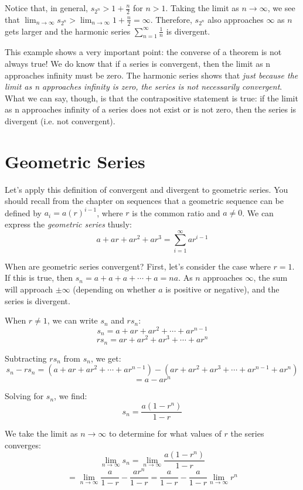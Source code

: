 Notice that, in general, $s_{2^n} > 1 + \frac{n}{2}$ for $n > 1$. Taking the 
limit as $n \to \infty$, we see that $\lim_{n \to \infty} s_{2^n} > \lim_{n 
\to \infty} 1 + \frac{n}{2} = \infty$. Therefore, $s_{2^n}$ also approaches 
$\infty$ as $n$ gets larger and the harmonic series $\sum_{n = 1}^\infty 
\frac{1}{n}$ is divergent. 

This example shows a very important point: the converse of a theorem is not 
always true! We do know that if a series is convergent, then the limit as n 
approaches infinity must be zero. The harmonic series shows that \textit{just 
because the limit as n approaches infinity is zero, the series is not 
necessarily convergent}. What we can say, though, is that the contrapositive 
statement is true: if the limit as n approaches infinity of a series does not 
exist or is not zero, then the series is divergent (i.e. not convergent). 

\section{Geometric Series}

Let's apply this definition of convergent and divergent to geometric 
series. You should recall from the chapter on sequences that a 
geometric sequence can be defined by $a_i = a(r)^{i-1}$, where $r$ 
is the common ratio and $a \neq 0$. We can express the 
\textit{geometric series} thusly:
$$a + ar + ar^2 + ar^3 = \sum_{i=1}^\infty ar^{i-1}$$

When are geometric series convergent? First, let's consider the case 
where $r=1$. If this is true, then $s_n = a + a + a + \cdots + a = 
na$. As $n$ approaches $\infty$, the sum will approach $\pm \infty$ 
(depending on whether $a$ is positive or negative), and the series is 
divergent. 

When $r \neq 1$, we can write $s_n$ and $rs_n$:
$$s_n = a + ar + ar^2 + \cdots + ar^{n-1}$$
$$rs_n = ar + ar^2 + ar^3 + \cdots + ar^n$$

Subtracting $rs_n$ from $s_n$, we get:
$$s_n - rs_n = (a + ar + ar^2 + \cdots + ar^{n-1}) - (ar + ar^2 + 
ar^3 + \cdots + ar^{n-1} + ar^n)$$
$$= a - ar^n$$

Solving for $s_n$, we find:
$$s_n = \frac{a(1-r^n)}{1-r}$$

We take the limit as $n \to \infty$ to determine for what values of 
$r$ the series converges:
$$\lim_{n \to \infty} s_n = \lim_{n \to \infty} \frac{a(1-r^n)}{1-r}$$
$$= \lim_{n\to \infty} \frac{a}{1-r} - \frac{ar^n}{1-r} = \frac{a}{1-r} 
- \frac{a}{1-r}\lim_{n \to \infty} r^n$$

